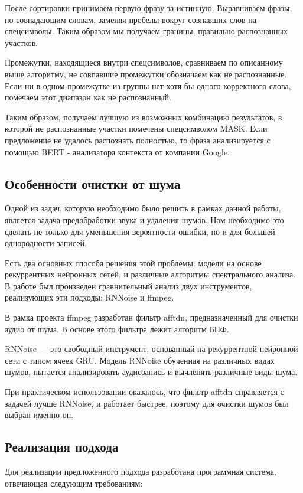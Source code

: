 \documentclass[conference]{IEEEtran}
\begin{document}
После сортировки принимаем первую фразу за истинную. Выравниваем фразы, по совпадающим словам, заменяя пробелы вокруг совпавших слов на спецсимволы. Таким образом мы получаем границы, правильно распознанных участков.

Промежутки, находящиеся внутри спецсимволов, сравниваем по описанному выше алгоритму, не совпавшие промежутки обозначаем как не распознанные. Если ни в одном промежутке из группы нет хотя бы одного корректного слова, помечаем этот диапазон как не распознанный.

Таким образом, получаем лучшую из возможных комбинацию результатов, в которой не распознанные участки помечены спецсимволом MASK. Если предложение не удалось распознать полностью, то фраза анализируется с помощью BERT - анализатора контекста от компании Google.

\subsection{Особенности очистки от шума}
Одной из задач, которую необходимо было решить в рамках данной работы, является задача предобработки звука и удаления шумов. Нам необходимо это сделать не только для уменьшения вероятности ошибки, но и для большей однородности записей.

Есть два основных способа решения этой проблемы: модели на основе рекуррентных нейронных сетей, и различные алгоритмы спектрального анализа.
В работе был произведен сравнительный анализ двух инструментов, реализующих эти подходы: RNNoise и ffmpeg.

В рамка проекта ffmpeg разработан фильтр afftdn, предназначенный для очистки аудио от шума. В основе этого фильтра лежит алгоритм БПФ.

RNNoise — это свободный инструмент, основанный на рекуррентной нейронной сети с типом ячеек GRU. Модель RNNoise обученная на различных видах шумов, пытается анализировать аудиозапись и вычленять различные виды шума.

При практическом использовании оказалось, что фильтр afftdn справляется с задачей лучше RNNoise, и работает быстрее, поэтому для очистки шумов был выбран именно он.

\subsection{Реализация подхода}

Для реализации предложенного подхода разработана программная система, отвечающая следующим требованиям:
\end{document}
